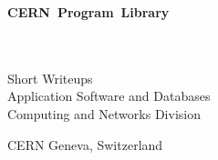  
 
\begin{titlepage}
\vspace*{-23mm}
\mbox{}
\hfill
{}\hbox{\huge\bf CERN Program Library}
\hfill\mbox{}
\begin{center}
\mbox{}\\[10mm]
\mbox{}\\[3cm]
{\Huge Short Writeups}\\[5cm]
{\LARGE Application Software and Databases}\\[1cm]
{\LARGE Computing and Networks Division}\\[2cm]
\end{center}
\vfill
\begin{center}\Large CERN Geneva, Switzerland\end{center}
\end{titlepage}
 

